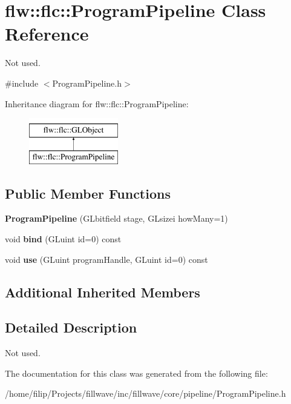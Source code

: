 \hypertarget{classflw_1_1flc_1_1ProgramPipeline}{}\section{flw\+:\+:flc\+:\+:Program\+Pipeline Class Reference}
\label{classflw_1_1flc_1_1ProgramPipeline}


Not used.  




{\ttfamily \#include $<$Program\+Pipeline.\+h$>$}

Inheritance diagram for flw\+:\+:flc\+:\+:Program\+Pipeline\+:\begin{figure}[H]
\begin{center}
\leavevmode
\includegraphics[height=2.000000cm]{classflw_1_1flc_1_1ProgramPipeline}
\end{center}
\end{figure}
\subsection*{Public Member Functions}
\begin{DoxyCompactItemize}
\item 
{\bfseries Program\+Pipeline} (G\+Lbitfield stage, G\+Lsizei how\+Many=1)\hypertarget{classflw_1_1flc_1_1ProgramPipeline_a27cccfde840ea71e39faefa82f117341}{}\label{classflw_1_1flc_1_1ProgramPipeline_a27cccfde840ea71e39faefa82f117341}

\item 
void {\bfseries bind} (G\+Luint id=0) const \hypertarget{classflw_1_1flc_1_1ProgramPipeline_aa2580736c54d61b0db6bf261ef95f794}{}\label{classflw_1_1flc_1_1ProgramPipeline_aa2580736c54d61b0db6bf261ef95f794}

\item 
void {\bfseries use} (G\+Luint program\+Handle, G\+Luint id=0) const \hypertarget{classflw_1_1flc_1_1ProgramPipeline_a9aa984d9acd38dcabb953e47c28df9d6}{}\label{classflw_1_1flc_1_1ProgramPipeline_a9aa984d9acd38dcabb953e47c28df9d6}

\end{DoxyCompactItemize}
\subsection*{Additional Inherited Members}


\subsection{Detailed Description}
Not used. 

The documentation for this class was generated from the following file\+:\begin{DoxyCompactItemize}
\item 
/home/filip/\+Projects/fillwave/inc/fillwave/core/pipeline/Program\+Pipeline.\+h\end{DoxyCompactItemize}
